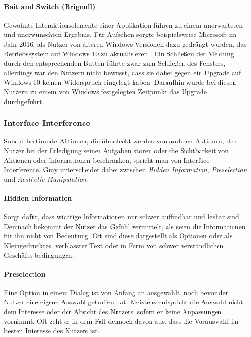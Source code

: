 \documentclass[a4paper]{article}
\begin{document}
\paragraph{Bait and Switch (Brignull)}
Gewohnte Interaktionselemente einer Applikation führen zu einem unerwarteten und unerwünschten Ergebnis. 
Für Aufsehen sorgte beispielsweise Microsoft im Jahr 2016, als Nutzer von älteren Windows-Versionen dazu gedrängt wurden, das Betriebssystem auf Windows 10 zu aktualisieren \cite{thurrott}. Ein Schließen der Meldung durch den entsprechenden Button führte zwar zum Schließen des Fensters, allerdings war den Nutzern nicht bewusst, dass sie dabei gegen ein Upgrade auf Windows 10 keinen Widerspruch eingelegt haben. Daraufhin wurde bei diesen Nutzern zu einem von Windows festgelegten Zeitpunkt das Upgrade durchgeführt. 

\subsubsection{Interface Interference}
Sobald bestimmte Aktionen, die überdeckt werden von anderen Aktionen, den Nutzer bei der Erledigung seiner Aufgaben stören oder die Sichtbarkeit von Aktionen oder Informationen beschränken, spricht man von Interface Interference. 
Gray \cite{gray} unterscheidet dabei zwischen \textit{Hidden Information}, \textit{Preselection} und \textit{Aesthetic Manipulation}. 

\paragraph{Hidden Information}
Sorgt dafür, dass wichtige Informationen nur schwer auffindbar und lesbar sind. Demnach bekommt der Nutzer das Gefühl vermittelt, als seien die Informationen für ihn nicht von Bedeutung. Oft sind diese dargestellt als Optionen oder als Kleingedrucktes, verblasster Text oder in Form von schwer verständlichen Geschäfts-bedingungen.

\paragraph{Preselection}
Eine Option in einem Dialog ist von Anfang an ausgewählt, noch bevor der Nutzer eine eigene Auswahl getroffen hat. Meistens entspricht die Auswahl nicht dem Interesse oder der Absicht des Nutzers, sofern er keine Anpassungen vornimmt. Oft geht er in dem Fall dennoch davon aus, dass die Vorauswahl im besten Interesse des Nutzers ist. 
 
\end{document}
